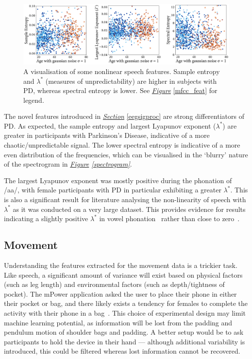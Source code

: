 \documentclass[12pt, twoside]{book}
\begin{document}
\begin{figure}[!htb]
	\centering
	\centerline{
		\includegraphics[width=1.15\linewidth]{speech_dynamic.png}
	}
	\caption{A visualisation of some nonlinear speech features. Sample entropy and $\lambda^*$ (measures of unpredictability) are higher in subjects with PD, whereas spectral entropy is lower. See \textit{\hyperref[mfcc_feat]{Figure}} \ref{mfcc_feat} for legend.}
	\vspace{-0.5em}
	\label{speechdynamic}
\end{figure}

The novel features introduced in \textit{\hyperref[eegsigproc]{Section}} \ref{eegsigproc} are strong differentiators of PD. As expected, the sample entropy and largest Lyapunov exponent ($\lambda^*$) are greater in participants with Parkinson's Disease, indicative of a more chaotic/unpredictable signal. The lower spectral entropy is indicative of a more even distribution of the frequencies, which can be visualised in the `blurry' nature of the spectrogram in \textit{\hyperref[spectrogram]{Figure} \ref{spectrogram}}. 




The largest Lyapunov exponent was mostly positive during the phonation of /aa/, with female participants with PD in particular exhibiting a greater $\lambda^*$. This is also a significant result for literature analysing the non-linearity of speech with $\lambda^*$ as it was conducted on a very large dataset. This provides evidence for results indicating a slightly positive $\lambda^*$ in vowel phonation~\cite{kokkinos2005nonlinearlyapunov, lyapunovpositive} rather than close to zero~\cite{banbrook1999speechlyapunov, lyapunovzero}.

\subsection{Movement}
Understanding the features extracted for the movement data is a trickier task. Like speech, a significant amount of variance will exist based on physical factors (such as leg length) and environmental factors (such as depth/tightness of pocket). The mPower application asked the user to place their phone in either their pocket or bag, and there likely exists a tendency for females to complete the activity with their phone in a bag~\cite{femalephone}. This choice of experimental design may limit machine learning potential, as information will be lost from the padding and pendulum motion of shoulder bags and padding. A better setup would be to ask participants to hold the device in their hand --- although additional variability is introduced, this could be filtered whereas lost information cannot be recovered.
\end{document}
